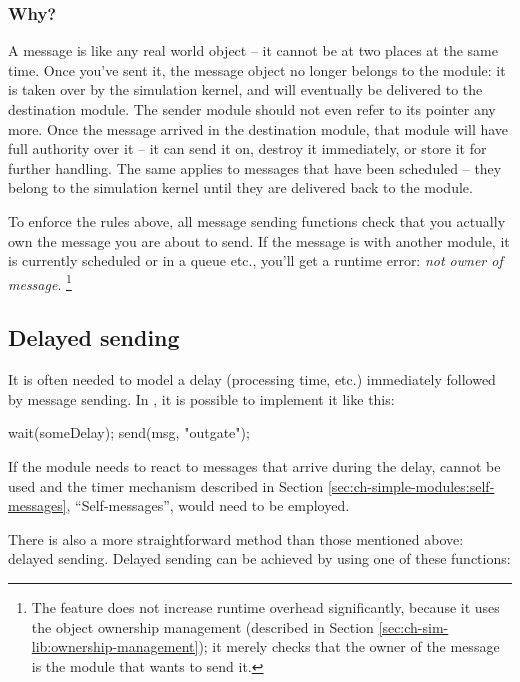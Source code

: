 \subsubsection{Why?}

A message is like any real world object -- it cannot be at two places
at the same time. Once you've sent it, the message object
no longer belongs to the module: it is taken over by the simulation kernel,
and will eventually be delivered to the destination module.
The sender module should not even refer to its pointer any more.
Once the message arrived in the destination module, that module
will have full authority over it -- it can send it on,
destroy it immediately, or store it for further handling.
The same applies to messages that have been scheduled -- they
belong to the simulation kernel until they are delivered back to
the module.

To enforce the rules above, all message sending functions
check that you actually own the message you are about to send.
If the message is with another module, it is currently scheduled or
in a queue etc., you'll get a runtime error: \textit{not owner of message}.
  \footnote{The feature does not increase runtime overhead significantly, because
  it uses the object ownership management (described in
  Section \ref{sec:ch-sim-lib:ownership-management});
  it merely checks that the owner of the message is the module that
  wants to send it.}



\subsection{Delayed sending}
\label{sec:simple-modules:delayed-sending}

It is often needed to model a delay (processing time, etc.) immediately
followed by message sending. In {\opp}, it is possible to implement
it like this:

\begin{cpp}
wait(someDelay);
send(msg, "outgate");
\end{cpp}


If the module needs to react to messages that arrive during the delay,
 cannot be used and the timer mechanism described in
Section \ref{sec:ch-simple-modules:self-messages}, ``Self-messages'', would
need to be employed.


There is also a more straightforward method than those mentioned above:
delayed sending. Delayed sending can be achieved
by using one of these functions:

